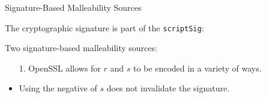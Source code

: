 \documentclass[handout]{beamer}
\begin{document}
\begin{frame}{Signature-Based Malleability Sources}

	The cryptographic signature is part of the \texttt{scriptSig}:\\
	
	\begin{scriptsize}
		\begin{figure}
			
		\end{figure}
	\end{scriptsize}
	
	Two signature-based malleability sources:
	\begin{itemize}
		\item[1.] OpenSSL allows for $r$ and $s$ to be encoded in a variety of ways.
		\item<2-> [2.] Using the negative of $s$ does not invalidate the signature.
	\end{itemize}
	

\end{frame}
\end{document}
